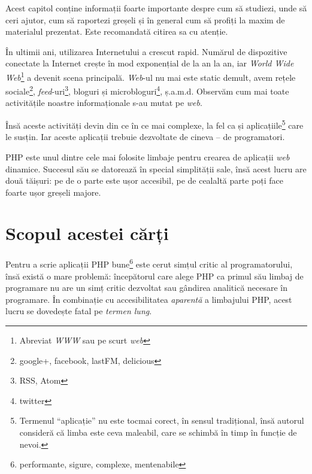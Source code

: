 
\begin{chapsummary}

Acest capitol conține informații foarte importante despre cum să studiezi, unde
să ceri ajutor, cum să raportezi greșeli și în general cum să profiți la maxim
de materialul prezentat. Este recomandată citirea sa cu atenție.

\end{chapsummary}

În ultimii ani, utilizarea Internetului a crescut rapid. Numărul de dispozitive
conectate la Internet crește în mod exponențial de la an la an, iar
\textsl{World Wide Web}\footnote{Abreviat
    \textsl{WWW} sau pe scurt
    \textsl{web}}
a devenit scena principală. \textit{Web}-ul nu mai este static demult, avem rețele
sociale\footnote{google+, facebook, lastFM, delicious}, \textsl{feed}-uri\footnote
{RSS,
Atom},
bloguri și microbloguri\footnote{twitter}, ș.a.m.d. Observăm cum mai
toate activitățile noastre informaționale s-au mutat pe \textit{web}.

Însă aceste activități devin din ce în ce mai complexe, la fel ca și
aplicațiile\footnote{Termenul ``aplicație'' nu este tocmai corect, în sensul
tradițional, însă autorul consideră că limba este ceva maleabil, care se
schimbă în timp în funcție de nevoi.} care le susțin.  Iar aceste aplicații
trebuie dezvoltate de cineva -- de programatori.

PHP este unul dintre cele mai folosite limbaje pentru crearea de aplicații \textit{web}
dinamice. Succesul său se datorează în special simplității sale, însă acest
lucru are două tăișuri: pe de o parte este ușor accesibil, pe de cealaltă parte
poți face foarte ușor greșeli majore.

\section*{Scopul acestei cărți}
{}

Pentru a scrie aplicații PHP bune\footnote{performante, sigure, complexe,
mentenabile} este cerut simțul critic al programatorului, însă există o mare
problemă: începătorul care alege PHP ca primul său limbaj de programare nu are
un simț critic dezvoltat sau gândirea analitică necesare în programare. În
combinație cu accesibilitatea \textit{aparentă} a limbajului PHP, acest lucru
se dovedește fatal pe \textit{termen lung}.

